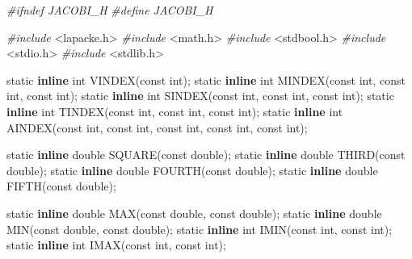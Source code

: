 \documentclass[12pt,]{article}
\newenvironment{Shaded}{\begin{snugshade}}{\end{snugshade}}
\newcommand{\KeywordTok}[1]{\textcolor[rgb]{0.13,0.29,0.53}{\textbf{#1}}}
\newcommand{\DataTypeTok}[1]{\textcolor[rgb]{0.13,0.29,0.53}{#1}}
\newcommand{\ImportTok}[1]{#1}
\newcommand{\PreprocessorTok}[1]{\textcolor[rgb]{0.56,0.35,0.01}{\textit{#1}}}
\newcommand{\NormalTok}[1]{#1}
\begin{document}
\begin{Shaded}
\begin{Highlighting}[]
\PreprocessorTok{#ifndef JACOBI_H}
\PreprocessorTok{#define JACOBI_H}

\PreprocessorTok{#include }\ImportTok{<lapacke.h>}
\PreprocessorTok{#include }\ImportTok{<math.h>}
\PreprocessorTok{#include }\ImportTok{<stdbool.h>}
\PreprocessorTok{#include }\ImportTok{<stdio.h>}
\PreprocessorTok{#include }\ImportTok{<stdlib.h>}

\DataTypeTok{static} \KeywordTok{inline} \DataTypeTok{int}\NormalTok{ VINDEX(}\DataTypeTok{const} \DataTypeTok{int}\NormalTok{);}
\DataTypeTok{static} \KeywordTok{inline} \DataTypeTok{int}\NormalTok{ MINDEX(}\DataTypeTok{const} \DataTypeTok{int}\NormalTok{, }\DataTypeTok{const} \DataTypeTok{int}\NormalTok{, }\DataTypeTok{const} \DataTypeTok{int}\NormalTok{);}
\DataTypeTok{static} \KeywordTok{inline} \DataTypeTok{int}\NormalTok{ SINDEX(}\DataTypeTok{const} \DataTypeTok{int}\NormalTok{, }\DataTypeTok{const} \DataTypeTok{int}\NormalTok{, }\DataTypeTok{const} \DataTypeTok{int}\NormalTok{);}
\DataTypeTok{static} \KeywordTok{inline} \DataTypeTok{int}\NormalTok{ TINDEX(}\DataTypeTok{const} \DataTypeTok{int}\NormalTok{, }\DataTypeTok{const} \DataTypeTok{int}\NormalTok{, }\DataTypeTok{const} \DataTypeTok{int}\NormalTok{);}
\DataTypeTok{static} \KeywordTok{inline} \DataTypeTok{int}\NormalTok{ AINDEX(}\DataTypeTok{const} \DataTypeTok{int}\NormalTok{, }\DataTypeTok{const} \DataTypeTok{int}\NormalTok{, }\DataTypeTok{const} \DataTypeTok{int}\NormalTok{, }\DataTypeTok{const} \DataTypeTok{int}\NormalTok{, }\DataTypeTok{const} \DataTypeTok{int}\NormalTok{);}

\DataTypeTok{static} \KeywordTok{inline} \DataTypeTok{double}\NormalTok{ SQUARE(}\DataTypeTok{const} \DataTypeTok{double}\NormalTok{);}
\DataTypeTok{static} \KeywordTok{inline} \DataTypeTok{double}\NormalTok{ THIRD(}\DataTypeTok{const} \DataTypeTok{double}\NormalTok{);}
\DataTypeTok{static} \KeywordTok{inline} \DataTypeTok{double}\NormalTok{ FOURTH(}\DataTypeTok{const} \DataTypeTok{double}\NormalTok{);}
\DataTypeTok{static} \KeywordTok{inline} \DataTypeTok{double}\NormalTok{ FIFTH(}\DataTypeTok{const} \DataTypeTok{double}\NormalTok{);}

\DataTypeTok{static} \KeywordTok{inline} \DataTypeTok{double}\NormalTok{ MAX(}\DataTypeTok{const} \DataTypeTok{double}\NormalTok{, }\DataTypeTok{const} \DataTypeTok{double}\NormalTok{);}
\DataTypeTok{static} \KeywordTok{inline} \DataTypeTok{double}\NormalTok{ MIN(}\DataTypeTok{const} \DataTypeTok{double}\NormalTok{, }\DataTypeTok{const} \DataTypeTok{double}\NormalTok{);}
\DataTypeTok{static} \KeywordTok{inline} \DataTypeTok{int}\NormalTok{ IMIN(}\DataTypeTok{const} \DataTypeTok{int}\NormalTok{, }\DataTypeTok{const} \DataTypeTok{int}\NormalTok{);}
\DataTypeTok{static} \KeywordTok{inline} \DataTypeTok{int}\NormalTok{ IMAX(}\DataTypeTok{const} \DataTypeTok{int}\NormalTok{, }\DataTypeTok{const} \DataTypeTok{int}\NormalTok{);}


\end{Highlighting}
\end{Shaded}
\end{document}
